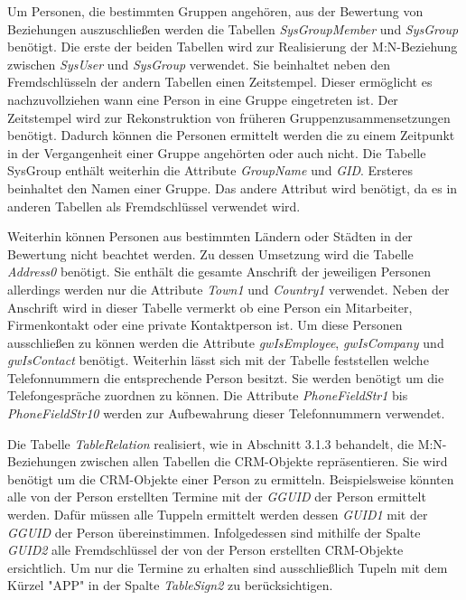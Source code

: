Um Personen, die bestimmten Gruppen angehören, aus der Bewertung von Beziehungen auszuschließen werden die Tabellen \textit{SysGroupMember} und \textit{SysGroup} benötigt. Die erste der beiden Tabellen wird zur Realisierung der M:N-Beziehung zwischen \textit{SysUser} und \textit{SysGroup} verwendet. Sie beinhaltet neben den Fremdschlüsseln der andern Tabellen einen Zeitstempel. Dieser ermöglicht es nachzuvollziehen wann eine Person in eine Gruppe eingetreten ist. Der Zeitstempel wird zur Rekonstruktion von früheren Gruppenzusammensetzungen benötigt. Dadurch können die Personen ermittelt werden die zu einem Zeitpunkt in der Vergangenheit einer Gruppe angehörten oder auch nicht. Die Tabelle SysGroup enthält weiterhin die Attribute \textit{GroupName} und \textit{GID}. Ersteres beinhaltet den Namen einer Gruppe. Das andere Attribut wird benötigt, da es in anderen Tabellen als Fremdschlüssel verwendet wird.  

Weiterhin können Personen aus bestimmten Ländern oder Städten in der Bewertung nicht beachtet werden. Zu dessen Umsetzung wird die Tabelle \textit{Address0}  benötigt. Sie enthält die gesamte Anschrift der jeweiligen Personen allerdings werden nur die Attribute \textit{Town1} und \textit{Country1} verwendet. Neben der Anschrift wird in dieser Tabelle vermerkt ob eine Person ein Mitarbeiter, Firmenkontakt oder eine private Kontaktperson ist. Um diese Personen ausschließen zu können werden die Attribute \textit{gwIsEmployee}, \textit{gwIsCompany} und \textit{gwIsContact} benötigt. Weiterhin lässt sich mit der Tabelle feststellen welche Telefonnummern die entsprechende Person besitzt. Sie werden benötigt um die Telefongespräche zuordnen zu können. Die Attribute \textit{PhoneFieldStr1} bis \textit{PhoneFieldStr10} werden zur Aufbewahrung dieser Telefonnummern verwendet. 

Die Tabelle \textit{TableRelation} realisiert, wie in Abschnitt 3.1.3 behandelt, die M:N-Beziehungen zwischen allen Tabellen die CRM-Objekte repräsentieren. Sie wird benötigt um die CRM-Objekte einer Person zu ermitteln. Beispielsweise könnten alle von der Person erstellten Termine mit der \textit{GGUID} der Person ermittelt werden. Dafür müssen alle Tuppeln ermittelt werden dessen \textit{GUID1} mit der \textit{GGUID} der Person übereinstimmen. Infolgedessen sind mithilfe der Spalte \textit{GUID2} alle Fremdschlüssel der von der Person erstellten CRM-Objekte ersichtlich. Um nur die Termine zu erhalten sind ausschließlich Tupeln mit dem Kürzel "APP" in der Spalte \textit{TableSign2} zu berücksichtigen. 

